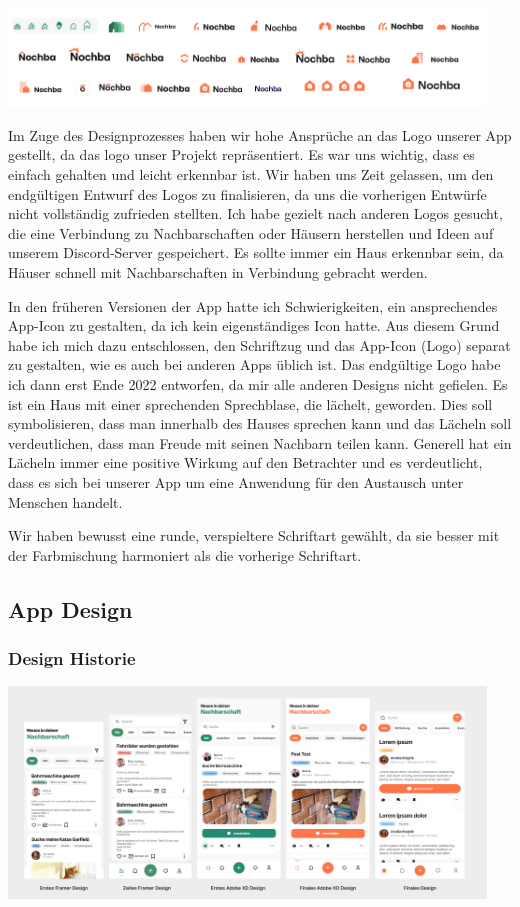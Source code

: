 \includegraphics[width=0.95\textwidth]{pics/logo-historie.png}



Im Zuge des Designprozesses haben wir hohe Ansprüche an das
Logo unserer App gestellt, da das logo unser Projekt repräsentiert. Es war uns wichtig, dass es einfach gehalten
und leicht erkennbar ist. Wir haben uns Zeit gelassen, um
den endgültigen Entwurf des Logos zu finalisieren, da uns
die vorherigen Entwürfe nicht vollständig zufrieden
stellten. Ich habe gezielt nach anderen Logos gesucht, die
eine Verbindung zu Nachbarschaften oder Häusern herstellen
und Ideen auf unserem Discord-Server gespeichert. Es sollte
immer ein Haus erkennbar sein, da Häuser schnell mit
Nachbarschaften in Verbindung gebracht werden.

In den früheren Versionen der App hatte ich Schwierigkeiten, ein ansprechendes App-Icon zu gestalten, da ich kein eigenständiges Icon hatte. Aus diesem Grund habe ich mich dazu entschlossen, den Schriftzug und das App-Icon (Logo) separat zu gestalten, wie es auch bei anderen Apps üblich ist. Das endgültige Logo habe ich dann erst Ende 2022 entworfen, da mir alle anderen Designs nicht gefielen. Es ist ein Haus mit einer sprechenden Sprechblase, die lächelt, geworden. Dies soll symbolisieren, dass man innerhalb des Hauses sprechen kann und das Lächeln soll verdeutlichen, dass man Freude mit seinen Nachbarn teilen kann. Generell hat ein Lächeln immer eine positive Wirkung auf den Betrachter und es verdeutlicht, dass es sich bei unserer App um eine Anwendung für den Austausch unter Menschen handelt.

Wir haben bewusst eine runde, verspieltere Schriftart gewählt, da sie besser mit der Farbmischung harmoniert als die vorherige Schriftart.
\subsection{App Design}
\subsubsection{Design Historie}

\includegraphics[width=0.95\textwidth]{pics/app-design-history.png}

